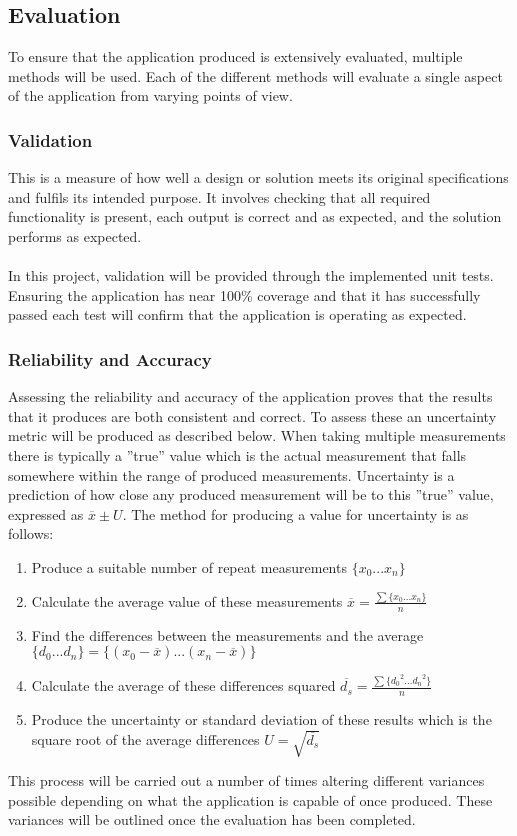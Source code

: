 	\subsection{Evaluation}\label{sec:methodology_evaluation}
		To ensure that the application produced is extensively evaluated, multiple methods will be used. Each of the different methods will evaluate a single aspect of the application from varying points of view.
		\subsubsection{Validation}
			This is a measure of how well a design or solution meets its original specifications and fulfils its intended purpose. It involves checking that all required functionality is present, each output is correct and as expected, and the solution performs as expected.
			\\\\
			In this project, validation will be provided through the implemented unit tests. Ensuring the application has near 100\% coverage and that it has successfully passed each test will confirm that the application is operating as expected.
		\subsubsection{Reliability and Accuracy}
			Assessing the reliability and accuracy of the application proves that the results that it produces are both consistent and correct. To assess these an uncertainty metric will be produced as described below. When taking multiple measurements there is typically a ”true” value which is the actual measurement that falls somewhere within the range of produced measurements. Uncertainty is a prediction of how close any produced measurement will be to this ”true” value, expressed as $\overline{x} \pm U$. The method for producing a value for uncertainty is as follows:
			\begin{enumerate}
				\item Produce a suitable number of repeat measurements $\{x_0 ... x_n\}$
				\item Calculate the average value of these measurements $\overline{x}=\frac{\sum\{x_0...x_n\}}{n}$
				\item Find the differences between the measurements and the average $\{d_0...d_n\} = \{(x_0-\overline{x})...(x_n-\overline{x})\}$
				\item Calculate the average of these differences squared $\overline{d_s} = \frac{\sum\{{d_0}^2...{d_n}^2\}}{n}$
				\item Produce the uncertainty or standard deviation of these results which is the square root of the average differences $U= \sqrt{\overline{d_s}}$
			\end{enumerate}
			This process will be carried out a number of times altering  different variances possible depending on what the application is capable of once produced. These variances will be outlined once the evaluation has been completed.
